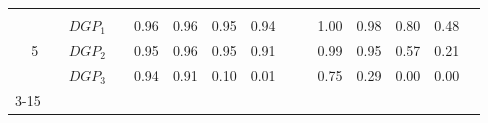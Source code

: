 \begin{table}[htbp]
{\begin{tabular}{cc|ccccccc|cccccc|}
    & & & & & & & & & & & & & & \\
    \multicolumn{2}{c|}{\multirow{3}{*}{5}} & \multicolumn{1}{l}{$DGP_{1}$} & & \multicolumn{1}{c}{0.96} & \multicolumn{1}{c}{0.96} & \multicolumn{1}{c}{0.95} & \multicolumn{1}{c}{0.94} & & & \multicolumn{1}{c}{1.00} & \multicolumn{1}{c}{0.98} & \multicolumn{1}{c}{0.80} & \multicolumn{1}{c}{0.48} & \\
    \multicolumn{2}{c|}{} & \multicolumn{1}{l}{$DGP_{2}$} & & \multicolumn{1}{c}{0.95} & \multicolumn{1}{c}{0.96} & \multicolumn{1}{c}{0.95} & \multicolumn{1}{c}{0.91} & & & \multicolumn{1}{c}{0.99} & \multicolumn{1}{c}{0.95} & \multicolumn{1}{c}{0.57} & \multicolumn{1}{c}{0.21} & \\
    \multicolumn{2}{c|}{} & \multicolumn{1}{l}{$DGP_{3}$} & & \multicolumn{1}{c}{0.94} & \multicolumn{1}{c}{0.91} & \multicolumn{1}{c}{0.10} & \multicolumn{1}{c}{0.01} & & & \multicolumn{1}{c}{0.75} & \multicolumn{1}{c}{0.29} & \multicolumn{1}{c}{0.00} & \multicolumn{1}{c}{0.00} & \\
    \cmidrule{3-15}
    \end{tabular}
  } %
\end{table}

